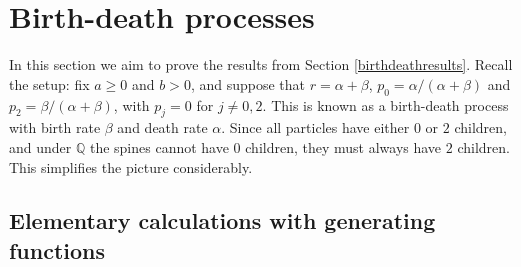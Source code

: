 \documentclass{article}
\theoremstyle{plain}
\theoremstyle{definition}
\newcommand{\Q}{\mathbb{Q}}
\begin{document}
\section{Birth-death processes}\label{BDsec}

In this section we aim to prove the results from Section \ref{birthdeathresults}. Recall the setup: fix $a\ge 0$ and $b>0$, and suppose that $r = \alpha+\beta$, $p_0 = \alpha/(\alpha+\beta)$ and $p_2 = \beta/(\alpha+\beta)$, with $p_j=0$ for $j\neq 0,2$. This is known as a birth-death process with birth rate $\beta$ and death rate $\alpha$. Since all particles have either $0$ or $2$ children, and under $\Q$ the spines cannot have $0$ children, they must always have $2$ children. This simplifies the picture considerably.










\subsection{Elementary calculations with generating functions}\label{BDgenfuncts}
\end{document}
